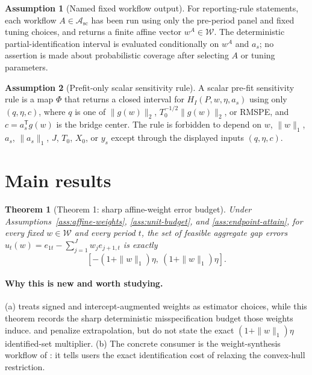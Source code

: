 \documentclass[11pt]{article}
\newcommand{\transpose}{\mathsf{T}}
\theoremstyle{definition}
\newtheorem{assumption}{Assumption}
\theoremstyle{plain}
\newtheorem{theorem}{Theorem}
\theoremstyle{remark}
\begin{document}
\begin{assumption}[Named fixed workflow output]\label{ass:named-workflow}
For reporting-rule statements, each workflow \(A\in\mathcal{A}_{\mathrm{sc}}\) has been run using only the pre-period panel and fixed tuning choices, and returns a finite affine vector \(w^A\in\mathcal{W}\). The deterministic partial-identification interval is evaluated conditionally on \(w^A\) and \(a_s\); no assertion is made about probabilistic coverage after selecting \(A\) or tuning parameters.
\end{assumption}

\begin{assumption}[Prefit-only scalar sensitivity rule]\label{ass:scalar-rule}
A scalar pre-fit sensitivity rule is a map \(\Phi\) that returns a closed interval for \(H_I(P,w,\eta,a_s)\) using only \((q,\eta,c)\), where \(q\) is one of \(\|g(w)\|_2\), \(T_0^{-1/2}\|g(w)\|_2\), or RMSPE, and \(c=a_s^\transpose g(w)\) is the bridge center. The rule is forbidden to depend on \(w\), \(\|w\|_1\), \(a_s\), \(\|a_s\|_1\), \(J\), \(T_0\), \(X_0\), or \(y_s\) except through the displayed inputs \((q,\eta,c)\).
\end{assumption}

\section{Main results}
\begin{theorem}[Theorem 1: sharp affine-weight error budget]\label{thm:l1-budget}
Under Assumptions~\ref{ass:affine-weights}, \ref{ass:unit-budget}, and \ref{ass:endpoint-attain}, for every fixed \(w\in\mathcal{W}\) and every period \(t\), the set of feasible aggregate gap errors \(u_t(w)=e_{1t}-\sum_{j=1}^Jw_je_{j+1,t}\) is exactly
\[
[-(1+\|w\|_1)\eta,\ (1+\|w\|_1)\eta].
\]
\end{theorem}

\paragraph{Why this is new and worth studying.}
(a) \citet{DoudchenkoImbens2016} treats signed and intercept-augmented weights as estimator choices, while this theorem records the sharp deterministic misspecification budget those weights induce. \citet{BenMichaelFellerRothstein2021} and \citet{ArkhangelskyAtheyHirshbergImbensWager2021} penalize extrapolation, but do not state the exact \((1+\|w\|_1)\eta\) identified-set multiplier. (b) The concrete consumer is the weight-synthesis workflow of \citet{DoudchenkoImbens2016}: it tells users the exact identification cost of relaxing the convex-hull restriction.
\end{document}
